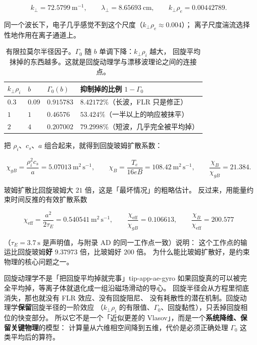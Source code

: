 \begin{equation}
k_\perp=72.5799\ \mathrm{m^{-1}},\qquad
\lambda_\perp=8.65693\ \mathrm{cm},\qquad
k_\perp\rho_e=0.00442789 .
\label{eq:app-ae-gyro2}
\end{equation}

同一个波长下，电子几乎感觉不到这个尺度（$k_\perp\rho_e\approx0.004$）；
离子尺度湍流选择性地作用在离子通道上。

\begin{table}[htbp]
\centering
\small
\caption{有限拉莫尔半径因子。$\Gamma_0$ 随 $b$ 单调下降：$k_\perp\rho_i$ 越大，
回旋平均抹掉的东西越多。这就是回旋动理学与漂移波理论之间的连接点。}
\label{tab:app-ae-gyro}
\begin{tabular}{p{2.4cm}p{2.6cm}p{3.0cm}p{5.2cm}}
\toprule
$k_\perp\rho_i$ & $b$ & $\Gamma_0(b)$ & 抑制掉的比例 $1-\Gamma_0$ \\
\midrule
$0.3$ & $0.09$ & $0.915783$ & $8.42172\%$（长波，FLR 只是修正） \\
$1$ & $1$ & $0.46576$ & $53.424\%$（一半以上的响应被抹平） \\
$2$ & $4$ & $0.207002$ & $79.2998\%$（短波，几乎完全被平均掉） \\
\bottomrule
\end{tabular}

\end{table}

把 $\rho_i$、$c_s$、$a$ 组合起来，就得到回旋玻姆扩散系数：

\begin{equation}
\chi_{gB}=\frac{\rho_i^2c_s}{a}=5.07013\ \mathrm{m^2\,s^{-1}},\qquad
\chi_{B}=\frac{T_e}{16eB}=108.42\ \mathrm{m^2\,s^{-1}},\qquad
\frac{\chi_B}{\chi_{gB}}=21.384 .
\label{eq:app-ae-chigb}
\end{equation}

玻姆扩散比回旋玻姆大 $21$ 倍，这是「最坏情况」的粗略估计。
反过来，用能量约束时间反推的有效扩散系数

\begin{equation}
\chi_{\mathrm{eff}}=\frac{a^2}{2\tau_E}=0.540541\ \mathrm{m^2\,s^{-1}},\qquad
\frac{\chi_{\mathrm{eff}}}{\chi_{gB}}=0.106613,\qquad
\frac{\chi_B}{\chi_{\mathrm{eff}}}=200.577
\label{eq:app-ae-chieff}
\end{equation}

（$\tau_E=3.7\ \mathrm{s}$ 是声明值，与附录 AD 的同一工作点一致）说明：
这个工作点的输运比回旋玻姆\textbf{好} $9.37973$ 倍，比玻姆好 $200$ 倍。
为什么能比玻姆扩散好，是约束物理的核心问题之一。

\begin{tip}{回旋动理学不是「把回旋平均掉就完事」}{tip-app-ae-gyro}
如果回旋真的可以被完全平均掉，等离子体就退化成一组沿磁场滑动的导心。
回旋半径会从方程里彻底消失，那也就没有 FLR 效应、没有回旋阻尼、
没有耗散性的潜在机制。回旋动理学\textbf{保留}回旋半径的一阶效应
（$k_\perp\rho_i$ 的有限值、$\Gamma_0$、回旋黏性），只丢掉回旋相位的快变部分。
所以它不是一个「近似更差的 Vlasov」，而是一个\textbf{系统降维、保留关键物理}的模型：
计算量从六维相空间降到五维，代价是必须正确处理 $\Gamma_0$ 这类平均后的算符。
\end{tip}

